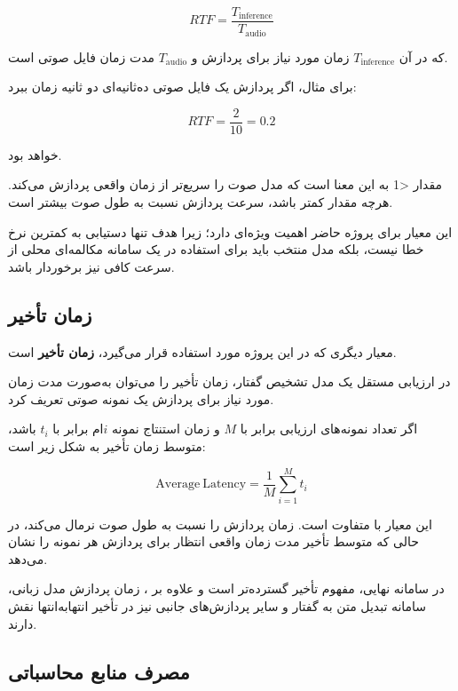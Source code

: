\begin{equation}
RTF
=
\frac{T_{\mathrm{inference}}}
     {T_{\mathrm{audio}}}
\end{equation}

که در آن $T_{\mathrm{inference}}$ زمان مورد نیاز برای پردازش
و $T_{\mathrm{audio}}$ مدت زمان فایل صوتی است.

برای مثال، اگر پردازش یک فایل صوتی ده‌ثانیه‌ای دو ثانیه
زمان ببرد:

\begin{equation}
RTF
=
\frac{2}{10}
=
0.2
\end{equation}

خواهد بود.

مقدار <1 به این معنا است که مدل صوت را سریع‌تر از
زمان واقعی پردازش می‌کند.
هرچه مقدار  کمتر باشد، سرعت پردازش نسبت به طول صوت
بیشتر است.

این معیار برای پروژه حاضر اهمیت ویژه‌ای دارد؛ زیرا هدف تنها
دستیابی به کمترین نرخ خطا نیست، بلکه مدل منتخب باید برای
استفاده در یک سامانه مکالمه‌ای محلی از سرعت کافی نیز برخوردار
باشد.


\subsection{زمان تأخیر}

معیار دیگری که در این پروژه مورد استفاده قرار می‌گیرد،
\textbf{زمان تأخیر}
است.

در ارزیابی مستقل یک مدل تشخیص گفتار، زمان تأخیر را می‌توان
به‌صورت مدت زمان مورد نیاز برای پردازش یک نمونه صوتی تعریف کرد.

اگر تعداد نمونه‌های ارزیابی برابر با $M$ و زمان استنتاج نمونه
$i$ام برابر با $t_i$ باشد، متوسط زمان تأخیر به شکل زیر است:

\begin{equation}
\mathrm{Average\ Latency}
=
\frac{1}{M}
\sum_{i=1}^{M} t_i
\end{equation}

این معیار با  متفاوت است.
 زمان پردازش را نسبت به طول صوت نرمال می‌کند، در حالی
که متوسط تأخیر مدت زمان واقعی انتظار برای پردازش هر نمونه را
نشان می‌دهد.

در سامانه نهایی، مفهوم تأخیر گسترده‌تر است و علاوه بر
، زمان پردازش مدل زبانی، سامانه تبدیل متن به گفتار
و سایر پردازش‌های جانبی نیز در تأخیر انتهابه‌انتها نقش دارند.


\subsection{مصرف منابع محاسباتی}

